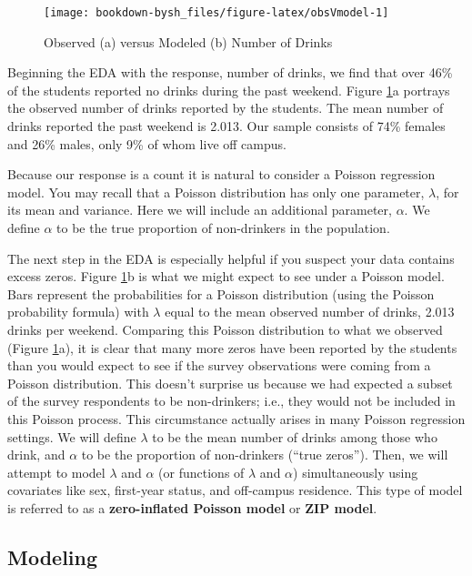 \documentclass[
]{krantz}
\begin{document}
\begin{figure}

{\centering \texttt{[image: bookdown-bysh\_files/figure-latex/obsVmodel-1]} 

}

\caption{Observed (a) versus Modeled (b) Number of Drinks}\label{fig:obsVmodel}
\end{figure}

Beginning the EDA with the response, number of drinks, we find that over 46\% of the students reported no drinks during the past weekend. Figure \ref{fig:obsVmodel}a portrays the observed number of drinks reported by the students. The mean number of drinks reported the past weekend is 2.013. Our sample consists of 74\% females and 26\% males, only 9\% of whom live off campus.

Because our response is a count it is natural to consider a Poisson regression model. You may recall that a Poisson distribution has only one parameter, \(\lambda\), for its mean and variance. Here we will include an additional parameter, \(\alpha\). We define \(\alpha\) to be the true proportion of non-drinkers in the population.

The next step in the EDA is especially helpful if you suspect your data contains excess zeros. Figure \ref{fig:obsVmodel}b is what we might expect to see under a Poisson model. Bars represent the probabilities for a Poisson distribution (using the Poisson probability formula) with \(\lambda\) equal to the mean observed number of drinks, 2.013 drinks per weekend. Comparing this Poisson distribution to what we observed (Figure \ref{fig:obsVmodel}a), it is clear that many more zeros have been reported by the students than you would expect to see if the survey observations were coming from a Poisson distribution. This doesn't surprise us because we had expected a subset of the survey respondents to be non-drinkers; i.e., they would not be included in this Poisson process. This circumstance actually arises in many Poisson regression settings. We will define \(\lambda\) to be the mean number of drinks among those who drink, and \(\alpha\) to be the proportion of non-drinkers (``true zeros''). Then, we will attempt to model \(\lambda\) and \(\alpha\) (or functions of \(\lambda\) and \(\alpha\)) simultaneously using covariates like sex, first-year status, and off-campus residence. This type of model is referred to as a \textbf{zero-inflated Poisson model} or \textbf{ZIP model}.

\hypertarget{modeling}{%
\subsection{Modeling}\label{modeling}}
\end{document}
